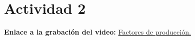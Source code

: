 \justify
\fontsize{12pt}{14}\
\setlength{\parindent}{0cm}

\section{Actividad 2}
\normalsize \textbf{Enlace a la grabación del video:} \href{https://1drv.ms/v/s!AvJq9wghbcuHgoM5GuvGIbDEuzAsUA?e=eNXhYZ}{Factores de producción.}